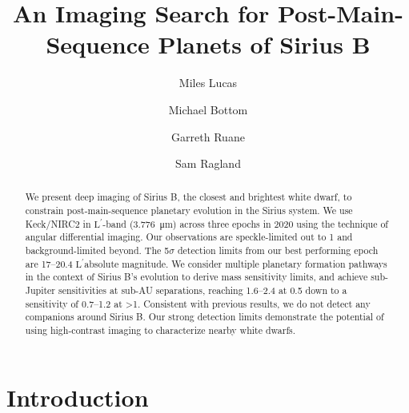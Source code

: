 \documentclass[twocolumn,linenumbers]{aastex631}
\newcommand\Lp{$\mathrm{L}^\prime$}
\begin{document}
\title{An Imaging Search for Post-Main-Sequence Planets of Sirius B}



\author[0000-0001-6341-310X]{Miles Lucas}

\author[0000-0003-1341-5531]{Michael Bottom}

\author[0000-0003-4769-1665]{Garreth Ruane}

\author[0000-0002-0696-1780]{Sam Ragland}


\begin{abstract}
We present deep imaging of Sirius B, the closest and brightest white dwarf, to constrain post-main-sequence planetary evolution in the Sirius system. We use Keck/NIRC2 in \Lp-band (\qty{3.776}{\micro\meter}) across three epochs in 2020 using the technique of angular differential imaging. Our observations are speckle-limited out to \qty{1}{\au} and background-limited beyond. The 5$\sigma$ detection limits from our best performing epoch are \numrange{17}{20.4} \Lp absolute magnitude. We consider multiple planetary formation pathways in the context of Sirius B's evolution to derive mass sensitivity limits, and achieve sub-Jupiter sensitivities at sub-AU separations, reaching \qtyrange{1.6}{2.4}{\jupitermass} at \qty{0.5}{\au} down to a sensitivity of \qtyrange{0.7}{1.2}{\jupitermass} at \textgreater\qty{1}{\au}. Consistent with previous results, we do not detect any companions around Sirius B. Our strong detection limits demonstrate the potential of using high-contrast imaging to characterize nearby white dwarfs.
\end{abstract}

\section{Introduction}\label{sec:intro}
\end{document}
